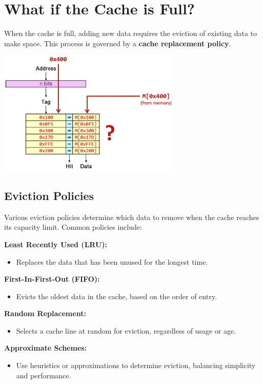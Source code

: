 \section{What if the Cache is Full?}
When the cache is full, adding new data requires the eviction of existing data to make space. This process is governed by a \textbf{cache replacement policy}. 
\begin{center}
    \includegraphics[width=0.65\textwidth]{chapters/chapter3a/images/full.png}
\end{center}
\subsection{Eviction Policies}
Various eviction policies determine which data to remove when the cache reaches its capacity limit. Common policies include:

    \item[-] \textbf{Least Recently Used (LRU):} 
    \begin{itemize}
        \item Replaces the data that has been unused for the longest time.
    \end{itemize}

    \item[-] \textbf{First-In-First-Out (FIFO):} 
    \begin{itemize}
        \item Evicts the oldest data in the cache, based on the order of entry.
    \end{itemize}

    \item[-] \textbf{Random Replacement:} 
    \begin{itemize}
        \item Selects a cache line at random for eviction, regardless of usage or age.
    \end{itemize}

    \item[-] \textbf{Approximate Schemes:} 
    \begin{itemize}
        \item Use heuristics or approximations to determine eviction, balancing simplicity and performance.
    \end{itemize}

